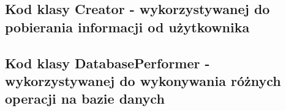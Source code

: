 \documentclass[a4paper, 11pt]{article}
\begin{document}
    \subsection{Kod klasy Creator - wykorzystywanej do pobierania informacji od użytkownika}
    

    \newpage

    \subsection{Kod klasy DatabasePerformer - wykorzystywanej do wykonywania różnych operacji na bazie danych}
    
\end{document}
